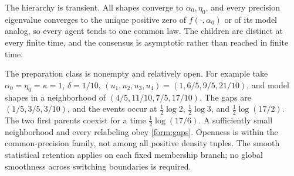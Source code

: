 The hierarchy is transient. All shapes converge to $\alpha_0,\eta_0$, and every precision eigenvalue converges to the unique positive zero of $f(\cdot,\alpha_0)$ or of its model analog, so every agent tends to one common law. The children are distinct at every finite time, and the consensus is asymptotic rather than reached in finite time.

The preparation class is nonempty and relatively open. For example take
$\alpha_0=\eta_0=\kappa=1$, $\delta=1/10$,
$(u_1,u_2,u_3,u_4)=(1,6/5,9/5,21/10)$, and model shapes in a neighborhood
of $(4/5,11/10,7/5,17/10)$. The gaps are $(1/5,3/5,3/10)$, and the events
occur at $\tfrac12\log2$, $\tfrac12\log3$, and $\tfrac12\log(17/2)$. The two first parents coexist for a time $\tfrac12\log(17/6)$.
A sufficiently small neighborhood and every relabeling obey
\cref{form:gaps}. Openness is within the common-precision family, not among
all positive density tuples. The smooth statistical retention applies on
each fixed membership branch; no global smoothness across switching
boundaries is required.

